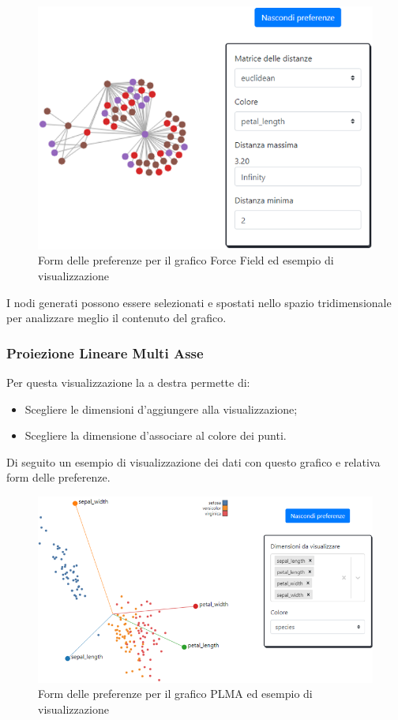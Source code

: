 \begin{figure}[H]
		\includegraphics[scale=0.8]{Images/ffpf.png}
		\centering
		\caption{Form delle preferenze per il grafico Force Field ed esempio di visualizzazione}
\end{figure}
I nodi generati possono essere selezionati e spostati nello spazio tridimensionale
per analizzare meglio il contenuto del grafico.

\newpage
\subsubsection{Proiezione Lineare Multi Asse}

Per questa visualizzazione la  a destra permette di:
\begin{itemize}
	\item Scegliere le dimensioni d'aggiungere alla visualizzazione;
	\item Scegliere la dimensione d'associare al colore dei punti.
\end{itemize} 

Di seguito un esempio di visualizzazione dei dati con questo grafico e relativa form delle preferenze.
\begin{figure}[H]
		\includegraphics[scale=0.9]{Images/plmad.png}
		\centering
		\caption{Form delle preferenze per il grafico PLMA ed esempio di visualizzazione}
\end{figure}

